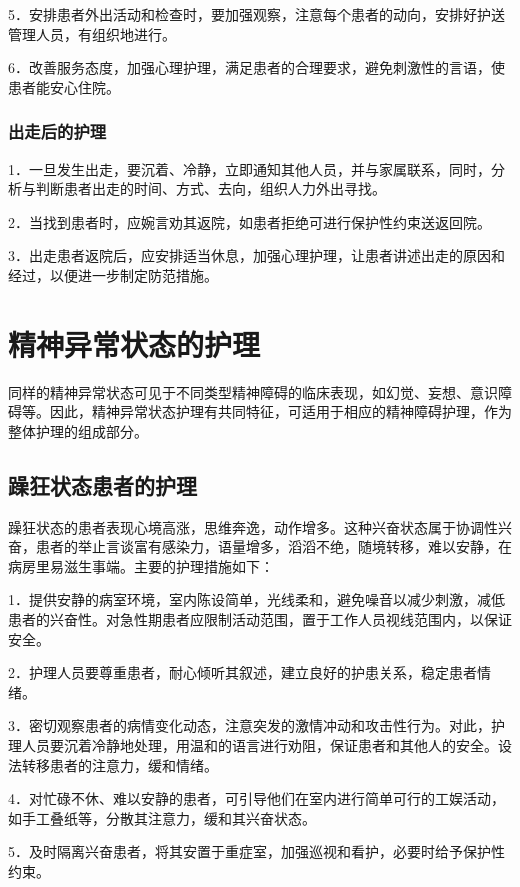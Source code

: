 5．安排患者外出活动和检查时，要加强观察，注意每个患者的动向，安排好护送管理人员，有组织地进行。

6．改善服务态度，加强心理护理，满足患者的合理要求，避免刺激性的言语，使患者能安心住院。

\subsubsection{出走后的护理}

1．一旦发生出走，要沉着、冷静，立即通知其他人员，并与家属联系，同时，分析与判断患者出走的时间、方式、去向，组织人力外出寻找。

2．当找到患者时，应婉言劝其返院，如患者拒绝可进行保护性约束送返回院。

3．出走患者返院后，应安排适当休息，加强心理护理，让患者讲述出走的原因和经过，以便进一步制定防范措施。

\section{精神异常状态的护理}

同样的精神异常状态可见于不同类型精神障碍的临床表现，如幻觉、妄想、意识障碍等。因此，精神异常状态护理有共同特征，可适用于相应的精神障碍护理，作为整体护理的组成部分。

\subsection{躁狂状态患者的护理}

躁狂状态的患者表现心境高涨，思维奔逸，动作增多。这种兴奋状态属于协调性兴奋，患者的举止言谈富有感染力，语量增多，滔滔不绝，随境转移，难以安静，在病房里易滋生事端。主要的护理措施如下：

1．提供安静的病室环境，室内陈设简单，光线柔和，避免噪音以减少刺激，减低患者的兴奋性。对急性期患者应限制活动范围，置于工作人员视线范围内，以保证安全。

2．护理人员要尊重患者，耐心倾听其叙述，建立良好的护患关系，稳定患者情绪。

3．密切观察患者的病情变化动态，注意突发的激情冲动和攻击性行为。对此，护理人员要沉着冷静地处理，用温和的语言进行劝阻，保证患者和其他人的安全。设法转移患者的注意力，缓和情绪。

4．对忙碌不休、难以安静的患者，可引导他们在室内进行简单可行的工娱活动，如手工叠纸等，分散其注意力，缓和其兴奋状态。

5．及时隔离兴奋患者，将其安置于重症室，加强巡视和看护，必要时给予保护性约束。

